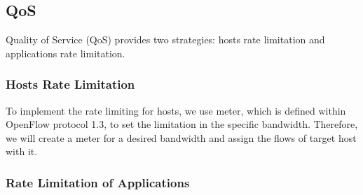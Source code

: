 \documentclass[conference]{IEEEtran}
\begin{document}
\subsection{QoS}
Quality of Service (QoS) provides two strategies: hosts rate limitation and applications rate limitation.

\subsubsection{Hosts Rate Limitation}
To implement the rate limiting for hosts, we use meter, which is defined within OpenFlow protocol 1.3, to set the limitation in the specific bandwidth. Therefore, we will create a meter for a desired bandwidth and assign the flows of target host with it.

%
%

\subsubsection{Rate Limitation of Applications}
\end{document}
